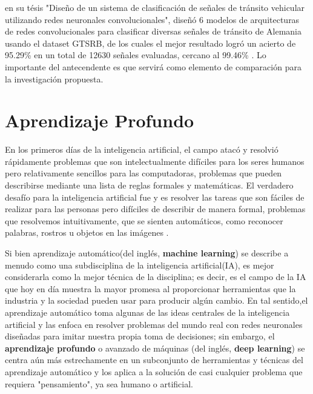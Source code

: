 		\citep{Ayuque2016} en su tésis "Diseño de un sistema de clasificación de señales de tránsito vehicular utilizando redes neuronales convolucionales", diseñó 6 modelos de arquitecturas de redes convolucionales para clasificar diversas señales de tránsito de Alemania usando el dataset GTSRB, de los cuales el mejor resultado logró un acierto de 95.29\% en un total de 12630 señales evaluadas, cercano al 99.46\% \citep{Ciresan}. Lo importante del antecendente es que servirá como elemento de comparación para la investigación propuesta. 
		


\section{Aprendizaje Profundo} 
	En los primeros días de la inteligencia artificial, el campo atacó y resolvió rápidamente problemas que son intelectualmente difíciles para los seres humanos pero relativamente sencillos para las computadoras, problemas que pueden describirse mediante una lista de reglas formales y matemáticas. El verdadero desafío para la inteligencia artificial fue y es resolver las tareas que son fáciles de realizar para las personas pero difíciles de describir de manera formal, problemas que resolvemos intuitivamente, que se sienten automáticos, como reconocer palabras, rostros u objetos en las imágenes \citep{Goodfellow-et-al-2016}.

	\vskip 0.4cm  
	Si bien aprendizaje automático(del inglés, {\bf machine learning}) se describe a menudo como una subdisciplina de la inteligencia artificial(IA), es mejor considerarla como la mejor técnica de la disciplina; es decir, es el campo de la IA que hoy en día muestra la mayor promesa al proporcionar herramientas que la industria y la sociedad pueden usar para producir algún cambio. En tal sentido,el aprendizaje automático toma algunas de las ideas centrales de la inteligencia artificial y las enfoca en resolver problemas del mundo real con redes neuronales diseñadas para imitar nuestra propia toma de decisiones; sin embargo, el {\bf aprendizaje profundo} o avanzado de máquinas (del inglés, {\bf deep learning}) se centra aún más estrechamente en un subconjunto de herramientas y técnicas del aprendizaje automático y los aplica a la solución de casi cualquier problema que requiera "pensamiento", ya sea humano o artificial.

